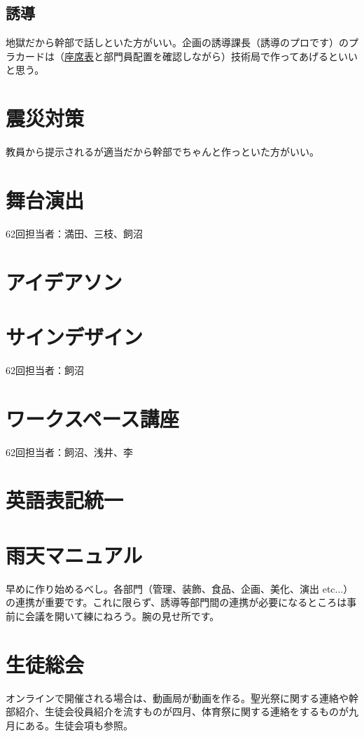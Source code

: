 \documentclass[a4paper]{ltjsreport}
\begin{document}
\subsection{誘導}
地獄だから幹部で話しといた方がいい。企画の誘導課長（誘導のプロです）のプラカードは（\href{https://docs.google.com/spreadsheets/d/1C1FCAPzH2EJLlMtq1CIA2K3Q68W5yUGb/edit?usp=sharing&ouid=113160890995933864933&rtpof=true&sd=true}{座席表}と部門員配置を確認しながら）技術局で作ってあげるといいと思う。

\section{震災対策}
教員から提示されるが適当だから幹部でちゃんと作っといた方がいい。

\section{舞台演出}
62回担当者：満田、三枝、飼沼

\section{アイデアソン}

\section{サインデザイン}
62回担当者：飼沼

\section{ワークスペース講座}
62回担当者：飼沼、浅井、李

\section{英語表記統一}

\section{雨天マニュアル}
早めに作り始めるべし。各部門（管理、装飾、食品、企画、美化、演出 etc...）の連携が重要です。これに限らず、誘導等部門間の連携が必要になるところは事前に会議を開いて練にねろう。腕の見せ所です。

\section{生徒総会}
オンラインで開催される場合は、動画局が動画を作る。聖光祭に関する連絡や幹部紹介、生徒会役員紹介を流すものが四月、体育祭に関する連絡をするものが九月にある。生徒会項も参照。\\
\end{document}
